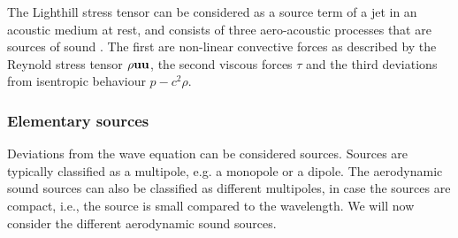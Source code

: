 The Lighthill stress tensor can be considered as a source term of a jet in an
acoustic medium at rest, and consists of three aero-acoustic processes that are
sources of sound \cite{Rienstra2017}. The first are non-linear convective forces
as described by the Reynold stress tensor $\rho \mathbf{u}\mathbf{u}$, the second
viscous forces $\tau$ and the third deviations from isentropic behaviour $p - c^2 \rho$.







\subsubsection*{Elementary sources}
Deviations from the wave equation can be considered sources. Sources are
typically classified as a multipole, e.g. a monopole or a dipole. The
aerodynamic sound sources can also be classified as different multipoles, in
case the sources are compact, i.e., the source is small compared to the
wavelength. We will now consider the different aerodynamic sound sources.

